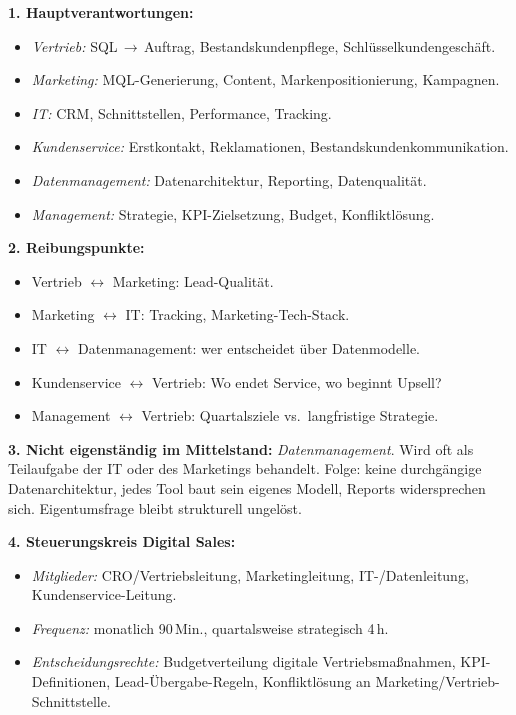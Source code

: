 \documentclass[11pt,a4paper,oneside]{article}
\begin{document}
\begin{loesungbox}
\textbf{1. Hauptverantwortungen:}
\begin{itemize}
  \item \emph{Vertrieb:} SQL\,$\rightarrow$\,Auftrag, Bestandskundenpflege, Schlüsselkundengeschäft.
  \item \emph{Marketing:} MQL-Generierung, Content, Markenpositionierung, Kampagnen.
  \item \emph{IT:} CRM, Schnittstellen, Performance, Tracking.
  \item \emph{Kundenservice:} Erstkontakt, Reklamationen, Bestandskundenkommunikation.
  \item \emph{Datenmanagement:} Datenarchitektur, Reporting, Datenqualität.
  \item \emph{Management:} Strategie, KPI-Zielsetzung, Budget, Konfliktlösung.
\end{itemize}

\textbf{2. Reibungspunkte:}
\begin{itemize}
  \item Vertrieb $\leftrightarrow$ Marketing: Lead-Qualität.
  \item Marketing $\leftrightarrow$ IT: Tracking, Marketing-Tech-Stack.
  \item IT $\leftrightarrow$ Datenmanagement: wer entscheidet über Datenmodelle.
  \item Kundenservice $\leftrightarrow$ Vertrieb: Wo endet Service, wo beginnt Upsell?
  \item Management $\leftrightarrow$ Vertrieb: Quartalsziele vs.\ langfristige Strategie.
\end{itemize}

\textbf{3. Nicht eigenständig im Mittelstand:}
\emph{Datenmanagement}. Wird oft als Teilaufgabe der IT oder des Marketings behandelt. Folge: keine durchgängige Datenarchitektur, jedes Tool baut sein eigenes Modell, Reports widersprechen sich. Eigentumsfrage bleibt strukturell ungelöst.

\textbf{4. Steuerungskreis Digital Sales:}
\begin{itemize}
  \item \emph{Mitglieder:} CRO/Vertriebsleitung, Marketingleitung, IT-/Datenleitung, Kundenservice-Leitung.
  \item \emph{Frequenz:} monatlich 90\,Min., quartalsweise strategisch 4\,h.
  \item \emph{Entscheidungsrechte:} Budgetverteilung digitale Vertriebsmaßnahmen, KPI-Definitionen, Lead-Übergabe-Regeln, Konfliktlösung an Marketing/Vertrieb-Schnittstelle.
\end{itemize}
\end{loesungbox}
\end{document}
